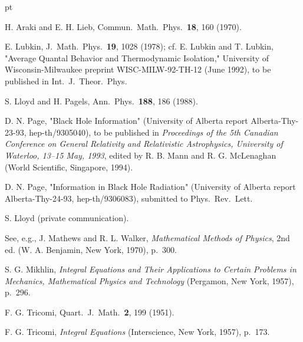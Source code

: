    pt
\pagebreak
	\begin{thebibliography}{99}
 H. Araki and E. H. Lieb, Commun.\ Math.\ Phys.\ {\bf 18},
160
(1970).

 E. Lubkin, J.\ Math.\ Phys.\ {\bf 19}, 1028 (1978); cf.
E. Lubkin
and T. Lubkin, "Average Quantal Behavior and Thermodynamic
Isolation,"
University of Wisconsin-Milwaukee preprint WISC-MILW-92-TH-12 (June
1992), to
be published in Int.\ J.\ Theor.\ Phys.

 S. Lloyd and H. Pagels, Ann.\ Phys.\ {\bf 188}, 186
(1988).

 D. N. Page, "Black Hole Information" (University of
Alberta report
Alberta-Thy-23-93, hep-th/9305040), to be published in {\em
Proceedings of the
5th Canadian Conference on General Relativity and Relativistic
Astrophysics,
University of Waterloo, 13--15 May, 1993}, edited by R. B. Mann and
R. G. McLenaghan (World Scientific, Singapore, 1994).

 D. N. Page, "Information in Black Hole Radiation"
(University of
Alberta report Alberta-Thy-24-93, hep-th/9306083), submitted to
Phys.\ Rev.\
Lett.

 S. Lloyd (private communication).

 See, e.g., J. Mathews and R. L. Walker, {\em
Mathematical Methods
of Physics}, 2nd ed. (W. A. Benjamin, New York, 1970), p.~300.

 S. G. Mikhlin, {\em Integral Equations and Their
Applications to
Certain Problems in Mechanics, Mathematical Physics and Technology}
(Pergamon,
New York, 1957), p.~296.

 F. G. Tricomi, Quart.\ J.\ Math.\ {\bf 2}, 199 (1951).

 F. G. Tricomi, {\em Integral Equations} (Interscience,
New York,
1957), p.~173.

	\end{thebibliography}


